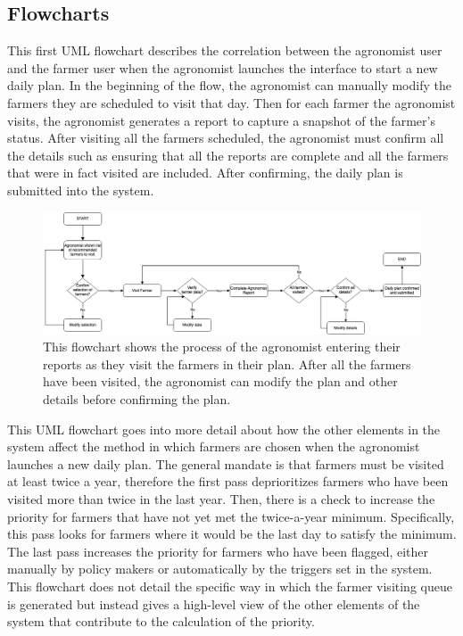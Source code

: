 \subsection{Flowcharts}
\begin{flushleft}
This first UML flowchart describes the correlation between the agronomist user and the farmer user when the agronomist launches the interface to start a new daily plan. In the beginning of the flow, the agronomist can manually modify the farmers they are scheduled to visit that day. Then for each farmer the agronomist visits, the agronomist generates a report to capture a snapshot of the farmer's status. After visiting all the farmers scheduled, the agronomist must confirm all the details such as ensuring that all the reports are complete and all the farmers that were in fact visited are included. After confirming, the daily plan is submitted into the system.
\end{flushleft}



\begin{figure}[hbt!]
\centering
\includegraphics[scale=0.4]{../images_diagrams/agronomistexecutesplan.png}

\caption{\label{fig:addOne{figure_counter}}This flowchart shows the process of the agronomist entering their reports as they visit the farmers in their plan. After all the farmers have been visited, the agronomist can modify the plan and other details before confirming the plan.}


\end{figure}

\begin{flushleft}
This UML flowchart goes into more detail about how the other elements in the system affect the method in which farmers are chosen when the agronomist launches a new daily plan. The general mandate is that farmers must be visited at least twice a year, therefore the first pass deprioritizes farmers who have been visited more than twice in the last year. Then, there is a check to increase the priority for farmers that have not yet met the twice-a-year minimum. Specifically, this pass looks for farmers where it would be the last day to satisfy the minimum. The last pass increases the priority for farmers who have been flagged, either manually by policy makers or automatically by the triggers set in the system. This flowchart does not detail the specific way in which the farmer visiting queue is generated but instead gives a high-level view of the other elements of the system that contribute to the calculation of the priority. 
\end{flushleft}


